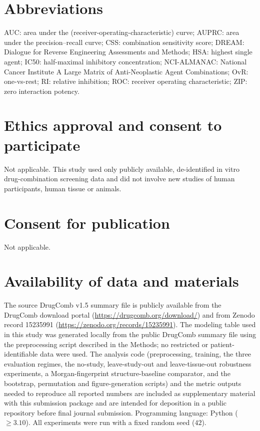 \documentclass{bmcart}
\begin{document}
\begin{backmatter}

\section*{Abbreviations}
AUC: area under the (receiver-operating-characteristic) curve; AUPRC: area under the precision--recall
curve; CSS: combination sensitivity score; DREAM: Dialogue for Reverse Engineering Assessments and
Methods; HSA: highest single agent; IC50: half-maximal inhibitory concentration; NCI-ALMANAC: National
Cancer Institute A Large Matrix of Anti-Neoplastic Agent Combinations; OvR: one-vs-rest; RI: relative
inhibition; ROC: receiver operating characteristic; ZIP: zero interaction potency.

\section*{Ethics approval and consent to participate}
Not applicable. This study used only publicly available, de-identified in vitro drug-combination
screening data and did not involve new studies of human participants, human tissue or animals.

\section*{Consent for publication}
Not applicable.

\section*{Availability of data and materials}
The source DrugComb v1.5 summary file is publicly available from the DrugComb download portal
(\url{https://drugcomb.org/download/}) and from Zenodo record 15235991
(\url{https://zenodo.org/records/15235991}). The modeling table used in this study was generated
locally from the public DrugComb summary file using the preprocessing script described in the Methods;
no restricted or patient-identifiable data were used. The analysis code (preprocessing, training, the
three evaluation regimes, the no-study, leave-study-out and leave-tissue-out robustness experiments, a
Morgan-fingerprint structure-baseline comparator, and the bootstrap, permutation and figure-generation
scripts) and the metric outputs needed to reproduce all reported numbers are included as supplementary
material with this submission package and are intended for deposition in a public repository before
final journal submission. Programming language: Python ($\geq 3.10$). All experiments were run with a
fixed random seed ($42$).


\end{backmatter}
\end{document}
